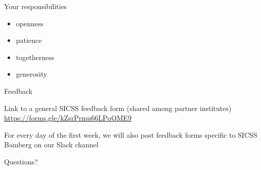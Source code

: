 \documentclass{beamer}
\begin{document}
\begin{frame}{Your responsibilities}

\begin{itemize}
\item openness
\item patience
\item togetherness
\item generosity
\end{itemize}

\end{frame}

\begin{frame}{Feedback}

Link to a general SICSS feedback form (shared among partner institutes)
\url{https://forms.gle/kZsrPrmu66LPqQME9}

\vspace{2mm}
For every day of the first week, we will also post feedback forms specific to SICSS Bamberg on our Slack channel

\end{frame}


\begin{frame}[standout]

\begin{center}
\LARGE
Questions?
\end{center}

\end{frame}
\end{document}
